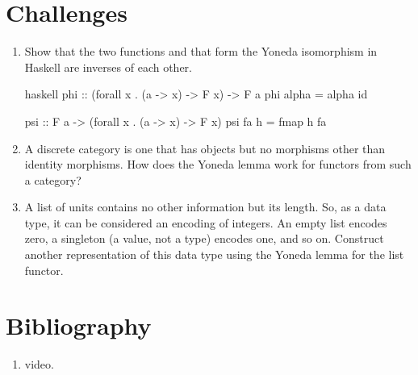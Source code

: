 \section{Challenges}

\begin{enumerate}
  \tightlist
  \item
        Show that the two functions  and  that form
        the Yoneda isomorphism in Haskell are inverses of each other.

        \begin{snip}{haskell}
phi :: (forall x . (a -> x) -> F x) -> F a
phi alpha = alpha id

psi :: F a -> (forall x . (a -> x) -> F x)
psi fa h = fmap h fa
\end{snip}
  \item
        A discrete category is one that has objects but no morphisms other
        than identity morphisms. How does the Yoneda lemma work for functors
        from such a category?
  \item
        A list of units \code{{[}(){]}} contains no other information but
        its length. So, as a data type, it can be considered an encoding of
        integers. An empty list encodes zero, a singleton \code{{[}(){]}} (a
        value, not a type) encodes one, and so on. Construct another
        representation of this data type using the Yoneda lemma for the list
        functor.
\end{enumerate}

\section{Bibliography}

\begin{enumerate}
  \tightlist
  \item
         video.
\end{enumerate}
